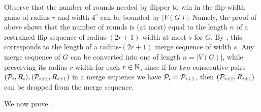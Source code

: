 \begin{remark}\label{rem:duration}
    Observe that the number of rounds needed by flipper to win in the flip-width game of radius $r$ and width $4^s$ can be bounded by $|V(G)|$.
    Namely, the proof of  above shows that 
    the number of rounds is (at most) equal to the length $n$ of a restrained flip sequence 
     of radius-$(2r+1)$ width at most \(s\) for $G$.
     By , this corresponds to the length of a radius-$(2r+1)$ merge sequence of width $s$. Any merge sequence of $G$ can be converted into one of length $n=|V(G)|$, while preserving its radius-$r$ width for each $r\in\N$, since if for two consecutive pairs $(\cal P_i, R_i),(\cal P_{i+1},R_{i+1})$ in a merge sequence we have $\cal P_i=\cal P_{i+1}$, then $(\cal P_{i+1},R_{i+1})$ can be dropped from the merge sequence.
\end{remark}

We now prove . 



